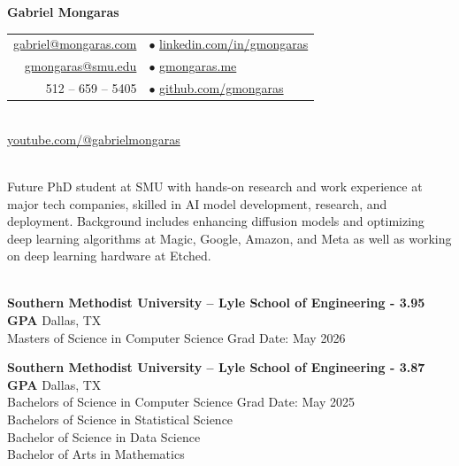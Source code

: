 \documentclass[a4paper,10pt]{article}
\begin{document}
\begin{center}
    {\LARGE \textbf{Gabriel Mongaras}} \\
    \vspace{10pt}
    \begin{tabular}{r l}
        \href{mailto:gabriel@mongaras.com}{gabriel@mongaras.com} \quad & $\bullet$ \quad \href{https://www.linkedin.com/in/gmongaras}{linkedin.com/in/gmongaras} \\
        \href{mailto:gmongaras@smu.edu}{gmongaras@smu.edu} \quad & $\bullet$ \quad \href{https://gmongaras.me/}{gmongaras.me} \\
        512 – 659 – 5405 \quad & $\bullet$ \quad \href{https://github.com/gmongaras}{github.com/gmongaras} \\
    \end{tabular} \\
    \href{https://www.youtube.com/@gabrielmongaras}{youtube.com/@gabrielmongaras} \\
\end{center}

\vspace{-15pt}

\noindent\hrulefill

 \vspace{1pt} \\
Future PhD student at SMU with hands-on research and work experience at major tech companies, skilled in AI model development, research, and deployment. Background includes enhancing diffusion models and optimizing deep learning algorithms at Magic, Google, Amazon, and Meta as well as working on deep learning hardware at Etched.

 \vspace{1pt} \\
\textbf{Southern Methodist University – Lyle School of Engineering - \textbf{3.95 GPA}} \hfill Dallas, TX \\
Masters of Science in Computer Science \hfill Grad Date: May 2026

\vspace{1pt}
\noindent\textbf{Southern Methodist University – Lyle School of Engineering - \textbf{3.87 GPA}} \hfill Dallas, TX \\
Bachelors of Science in Computer Science \hfill Grad Date: May 2025 \\
Bachelors of Science in Statistical Science \\
Bachelor of Science in Data Science \\
Bachelor of Arts in Mathematics
\end{document}
